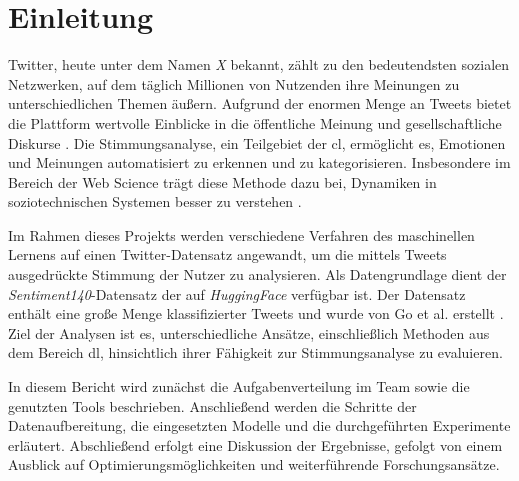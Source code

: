 \section{Einleitung}\label{sec:einleitung}

Twitter, heute unter dem Namen \textit{X} bekannt, zählt zu den bedeutendsten sozialen Netzwerken, auf dem täglich Millionen von Nutzenden ihre Meinungen zu unterschiedlichen Themen äußern.
Aufgrund der enormen Menge an Tweets bietet die Plattform wertvolle Einblicke in die öffentliche Meinung und gesellschaftliche Diskurse \cite{pak2010twitter}.
Die Stimmungsanalyse, ein Teilgebiet der \gls{cl}, ermöglicht es, Emotionen und Meinungen automatisiert zu erkennen und zu kategorisieren.
Insbesondere im Bereich der Web Science trägt diese Methode dazu bei, Dynamiken in soziotechnischen Systemen besser zu verstehen \cite{berners2006web, liu2012sentiment}.

Im Rahmen dieses Projekts werden verschiedene Verfahren des maschinellen Lernens auf einen Twitter-Datensatz angewandt, um die mittels Tweets ausgedrückte Stimmung der Nutzer zu analysieren.
Als Datengrundlage dient der \textit{Sentiment140}-Datensatz der auf \textit{HuggingFace} \cite{sentiment1402023huggingface} verfügbar ist.
Der Datensatz enthält eine große Menge klassifizierter Tweets und wurde von Go et al. erstellt \cite{go2009twitter}.
Ziel der Analysen ist es, unterschiedliche Ansätze, einschließlich Methoden aus dem Bereich \gls{dl}, hinsichtlich ihrer Fähigkeit zur Stimmungsanalyse zu evaluieren.

In diesem Bericht wird zunächst die Aufgabenverteilung im Team sowie die genutzten Tools beschrieben.
Anschließend werden die Schritte der Datenaufbereitung, die eingesetzten Modelle und die durchgeführten Experimente erläutert.
Abschließend erfolgt eine Diskussion der Ergebnisse, gefolgt von einem Ausblick auf Optimierungsmöglichkeiten und weiterführende Forschungsansätze.
